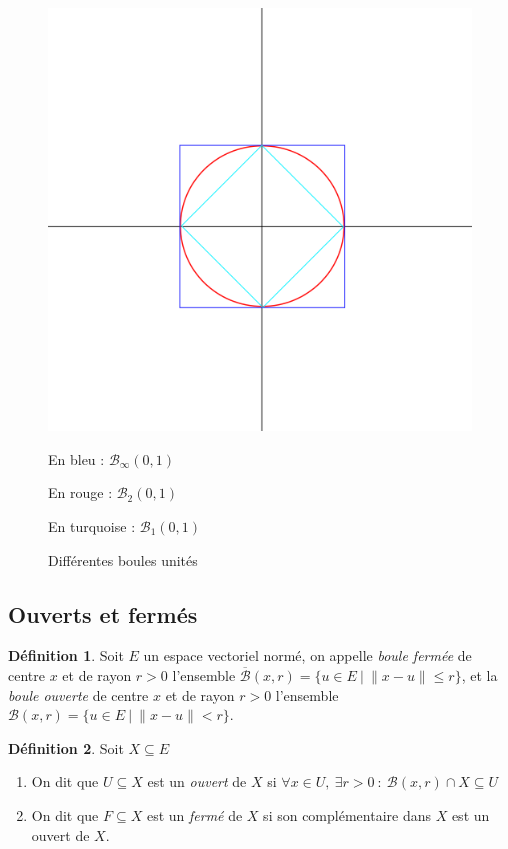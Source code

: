 \documentclass[]{article}
\theoremstyle{remark}
\theoremstyle{definition}
\newtheorem{mydef}{Définition}
\begin{document}
\begin{figure}[h!]
	\centering
	\includegraphics[width=350pt]{Schema1}
	\caption{Différentes boules unités}
	En bleu : $\mathcal{B}_\infty(0, 1)$
	
	En rouge : $\mathcal{B}_2(0, 1)$
	
	En turquoise : $\mathcal{B}_1(0, 1)$
\end{figure}

\subsection{Ouverts et fermés}

\begin{mydef}
	Soit $E$ un espace vectoriel normé, on appelle \textit{boule fermée} de centre $x$ et de rayon $r > 0$ l'ensemble $\overline{\mathcal{B}}(x, r) = \{u \in E ~|~ \|x-u\| \leqslant r\}$, et la \textit{boule ouverte} de centre $x$ et de rayon $r > 0$ l'ensemble $\mathcal{B}(x, r) = \{u \in E ~|~ \|x-u\| < r\}$.
\end{mydef}

\begin{mydef}
	Soit $X \subseteq E$
	\begin{enumerate}
		\item On dit que $U \subseteq X$ est un \textit{ouvert} de $X$ si $\forall x \in U, ~ \exists r > 0 ~ : ~ \mathcal{B}(x, r) \cap X \subseteq U$
		\item On dit que $F \subseteq X$ est un \textit{fermé} de $X$ si son complémentaire dans $X$ est un ouvert de $X$.
	\end{enumerate}
\end{mydef}
\end{document}
